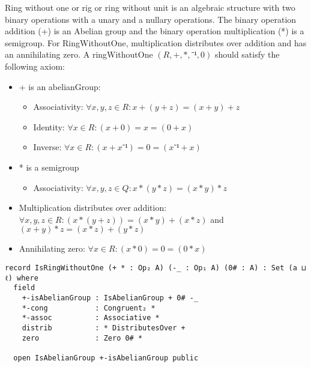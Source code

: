 Ring without one or rig or ring without unit is an algebraic structure with two
binary operations with a unary and a nullary operations. The binary operation
addition (+) is an Abelian group and the binary operation multiplication (*) is
a semigroup. For RingWithoutOne, multiplication distributes over addition and
has an annihilating zero. A ringWithoutOne $(R,+,*,⁻¹,0)$ should satisfy the
following axiom:
\begin{itemize}
  \item + is an abelianGroup:
   \begin{itemize}
    \item Associativity: $\forall x,y,z \in R: x + (y + z) = (x + y) + z$
    \item Identity: $\forall x \in R: (x + 0) = x = (0 + x)$
    \item Inverse: $\forall x \in R: (x + x⁻¹) = 0 = (x⁻¹ + x)$
  \end{itemize}
  \item * is a semigroup
  \begin{itemize}
    \item Associativity: $ \forall x,y,z \in Q: x * (y*z)  = (x*y)*z$
  \end{itemize}
  \item Multiplication distributes over addition: \(\forall x , y , z \in R: (x * (y + z)) = (x * y) + (x
  * z)\) and \( (x + y) * z = (x * z) + (y * z) \)
  \item Annihilating zero: \(\forall x \in R: (x * 0) = 0 = (0 * x)\)
\end{itemize}

\begin{verbatim}
record IsRingWithoutOne (+ * : Op₂ A) (-_ : Op₁ A) (0# : A) : Set (a ⊔ ℓ) where
  field
    +-isAbelianGroup : IsAbelianGroup + 0# -_
    *-cong           : Congruent₂ *
    *-assoc          : Associative *
    distrib          : * DistributesOver +
    zero             : Zero 0# *

  open IsAbelianGroup +-isAbelianGroup public
\end{verbatim}
